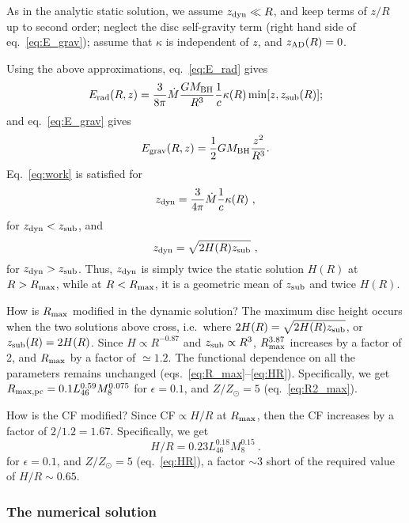 \documentclass[a4paper,fleqn,usenatbib]{mnras}
\newcommand{\Mbh}{\mbox{$M_{\rm BH}$}}
\begin{document}
As in the analytic static solution, we assume $z_{\rm dyn}\ll R$, and keep terms of $z/R$ up to second order; neglect the 
disc self-gravity term (right hand side of eq.~\ref{eq:E_grav}); assume that $\kappa$ is independent of $z$, and 
$z_{\rm AD}(R)=0$.

Using the above approximations, eq.~\ref{eq:E_rad} gives
\begin{equation}
E_{\rm rad}(R,z) = \frac{3}{8\pi}\dot{M}\frac{G\Mbh}{R^3}\frac{1}{c}\kappa(R) \min[z,z_{\rm sub}(R)];
\end{equation}
and eq.~\ref{eq:E_grav} gives
\begin{equation}
E_{\rm grav}(R,z)=\frac{1}{2}G M_{\rm BH}\frac{z^2}{R^3}. \label{eq:E_grav_approx}
\end{equation}
Eq.~\ref{eq:work} is satisfied for
\begin{equation}
z_{\rm dyn}= \frac{3}{4\pi}\dot{M}\frac{1}{c}\kappa(R)\ , 
\end{equation}
for  $z_{\rm dyn}<z_{\rm sub}$, and
\begin{equation}
z_{\rm dyn}= \sqrt{2H(R)z_{\rm sub}} \ , 
\label{eq:z_dyn}
\end{equation}
for $z_{\rm dyn}>z_{\rm sub}$. 
Thus, $z_{\rm dyn}$ is simply twice the static solution $H(R)$ at $R>R_{\rm max}$,
while at $R<R_{\rm max}$, it is a geometric mean of $z_{\rm sub}$ and twice $H(R)$.

How is $R_{\rm max}$ modified in the dynamic solution? The maximum disc height occurs when
the two solutions above cross, i.e.\ where $2H(R)=\sqrt{2H(R)z_{\rm sub}}$, or
$z_{\rm sub}(R)=2H(R)$. Since $H\propto R^{-0.87}$ and
$z_{\rm sub}\propto R^3$, $R_{\rm max}^{3.87}$ increases by a factor of 2, and 
$R_{\rm max}$ by a factor of $\simeq 1.2$. The functional dependence on all the parameters remains unchanged
(eqs.~\ref{eq:R_max}--\ref{eq:HR}). Specifically, we get $R_{\rm max, pc}=0.1L_{46}^{0.59}M_8^{0.075}$
for $\epsilon=0.1$, and $Z/Z_{\odot}=5$ (eq.~\ref{eq:R2_max}).

How is the CF modified? Since CF$\propto H/R$ at $R_{\rm max}$, then the CF increases by a 
factor of $2/1.2=1.67$.
Specifically, we get
\begin{equation}
  H/R=0.23L_{46}^{0.18}M_8^{0.15}\ .
\label{eq:HR1}
\end{equation}
for $\epsilon=0.1$, and $Z/Z_{\odot}=5$ (eq.~\ref{eq:HR}), a factor $\sim 3$ short of the  
required value of $H/R\sim 0.65$.


\subsubsection{The numerical solution}
\end{document}
